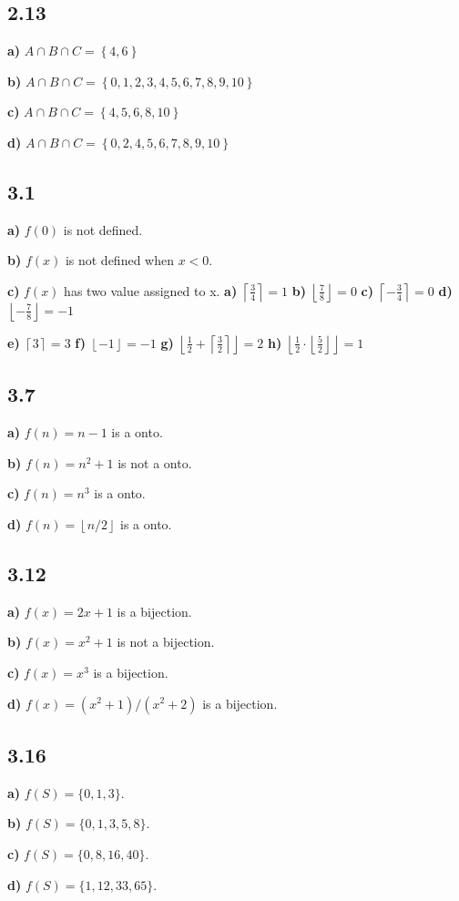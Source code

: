 \documentclass[10pt]{ctexart}
\begin{document}
    \subsection*{2.13}
    \textbf{a)} $A \cap B \cap C = \left\{4,6\right\}$ \par
    \textbf{b)} $A \cap B \cap C = \left\{0,1,2,3,4,5,6,7,8,9,10\right\}$ \par
    \textbf{c)} $A \cap B \cap C = \left\{4,5,6,8,10\right\}$ \par
    \textbf{d)} $A \cap B \cap C = \left\{0,2,4,5,6,7,8,9,10\right\}$
    \subsection*{3.1}
    \textbf{a)} $f(0)$ is not defined. \par
    \textbf{b)} $f(x)$ is not defined when $x < 0$. \par
    \textbf{c)} $f(x)$ has two value assigned to x.
    \textbf{a)} $\left\lceil \frac{3}{4} \right\rceil = 1 $ \quad
    \textbf{b)} $\left\lfloor \frac{7}{8} \right\rfloor = 0 $ \quad
    \textbf{c)} $\left\lceil -\frac{3}{4} \right\rceil = 0 $ \quad
    \textbf{d)} $\left\lfloor -\frac{7}{8} \right\rfloor = -1 $ \quad
    \par
    \textbf{e)} $\left\lceil 3 \right\rceil = 3 $ \quad
    \textbf{f)} $\left\lfloor -1 \right\rfloor = -1 $ \quad
    \textbf{g)} $\left\lfloor \frac{1}{2} + \left\lceil \frac{3}{2}\right\rceil \right\rfloor = 2 $ \quad
    \textbf{h)} $\left\lfloor \frac{1}{2} \cdot \left\lfloor \frac{5}{2}\right\rfloor \right\rfloor = 1 $ \quad
    \subsection*{3.7}
    \textbf{a)} $f(n) = n - 1$ is a onto. \par
    \textbf{b)} $f(n) = n^2 + 1$ is not a onto. \par
    \textbf{c)} $f(n) = n^3$ is a onto. \par
    \textbf{d)} $f(n) = \left\lfloor n/2 \right\rfloor$ is a onto.
    \subsection*{3.12}
    \textbf{a)} $f(x) = 2x + 1$ is a bijection. \par
    \textbf{b)} $f(x) = x^2 + 1$ is not a bijection. \par
    \textbf{c)} $f(x) = x^3$ is a bijection. \par
    \textbf{d)} $f(x) = (x^2 + 1)/(x^2 + 2)$ is a bijection.
    \subsection*{3.16}
    \textbf{a)} $f(S) = \{0,1,3\}$.\par
    \textbf{b)} $f(S) = \{0,1,3,5,8\}$.\par
    \textbf{c)} $f(S) = \{0,8,16,40\}$.\par
    \textbf{d)} $f(S) = \{1,12,33,65\}$.
\end{document}
